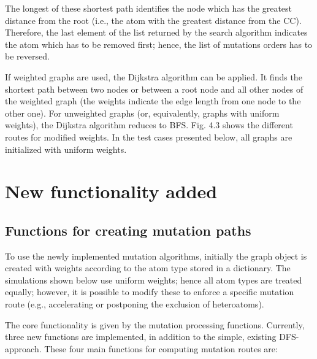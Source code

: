 The longest of these shortest path identifies the node which has the greatest
distance from the root (i.e., the atom with the greatest distance from
the CC). Therefore, the last element of the list returned by the search algorithm indicates the atom which has to be removed first; hence, the list of mutations orders has to be reversed.

If weighted graphs are used, the Dijkstra algorithm can be applied.
It finds the shortest path between two nodes or between a root node
and all other nodes of the weighted graph (the weights indicate the
edge length from one node to the other one). For unweighted graphs
(or, equivalently, graphs with uniform weights), the Dijkstra algorithm
reduces to BFS. Fig. 4.3 shows the different routes for modified weights.
In the test cases presented below, all graphs are initialized with uniform weights.

\section{New functionality added}

\subsection{Functions for creating mutation paths}

To use the newly implemented mutation algorithms, initially the graph object
is created with weights according to the atom type stored in a dictionary. The simulations shown
below use uniform weights; hence all atom types are treated equally; however, it is possible to modify these to
enforce a specific mutation route (e.g., accelerating or postponing
the exclusion of heteroatoms). 

The core functionality is given by the mutation processing functions.
Currently, three new functions are implemented, in addition to
the simple, existing DFS-approach.
These four main functions for computing mutation routes are:

